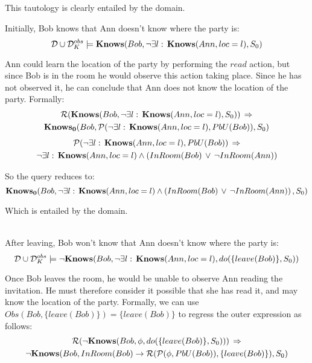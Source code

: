 This tautology is clearly entailed by the domain.\\
\newpage{}

\begin{example}
Initially, Bob knows that Ann doesn't know where the party is:\[
\mathcal{D}\cup\mathcal{D}_{K}^{obs}\models\mathbf{Knows}(Bob,\neg\exists l:\,\mathbf{Knows}(Ann,loc=l),S_{0})\]

\end{example}
Ann could learn the location of the party by performing the $read$
action, but since Bob is in the room he would observe this action
taking place. Since he has not observed it, he can conclude that Ann
does not know the location of the party. Formally:\begin{multline*}
\mathcal{R}(\mathbf{Knows}(Bob,\neg\exists l:\,\mathbf{Knows}(Ann,loc=l),S_{0}))\,\Rightarrow\\
\mathbf{Knows_{0}}(Bob,\mathcal{P}(\neg\exists l:\,\mathbf{Knows}(Ann,loc=l),PbU(Bob)),S_{0})\end{multline*}
\begin{multline*}
\mathcal{P}(\neg\exists l:\,\mathbf{Knows}(Ann,loc=l),PbU(Bob))\,\Rightarrow\\
\neg\exists l:\,\mathbf{Knows}(Ann,loc=l)\wedge\left(InRoom(Bob)\,\vee\,\neg InRoom(Ann)\right)\end{multline*}


So the query reduces to:\[
\mathbf{Knows_{0}}(Bob,\neg\exists l:\,\mathbf{Knows}(Ann,loc=l)\wedge\left(InRoom(Bob)\,\vee\,\neg InRoom(Ann)\right),S_{0})\]


Which is entailed by the domain.\\
\\


\begin{example}
After leaving, Bob won't know that Ann doesn't know where the party
is:\[
\mathcal{D}\cup\mathcal{D}_{K}^{obs}\models\mathbf{\neg Knows}(Bob,\neg\exists l:\,\mathbf{Knows}(Ann,loc=l),do(\{leave(Bob)\},S_{0}))\]

\end{example}
Once Bob leaves the room, he would be unable to observe Ann reading
the invitation. He must therefore consider it possible that she has
read it, and may know the location of the party. Formally, we can
use $Obs(Bob,\{leave(Bob)\})=\{leave(Bob)\}$ to regress the outer
expression as follows:\begin{multline*}
\mathcal{R}(\neg\mathbf{Knows}(Bob,\phi,do(\{leave(Bob)\},S_{0})))\,\Rightarrow\\
\neg\mathbf{Knows}(Bob,InRoom(Bob)\rightarrow\mathcal{R}(\mathcal{P}(\phi,PbU(Bob)),\{leave(Bob)\}),S_{0})\end{multline*}


